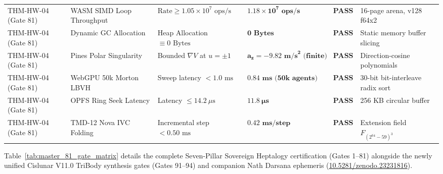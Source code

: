 \documentclass[11pt,a4paper,reqno]{article}
\def\texttt#1{#1}%
\def\mathbb#1{#1}%
\newcommand{\zenodo}[1]{\href{https://doi.org/10.5281/zenodo.#1}{\texttt{10.5281/\allowbreak zenodo.#1}}}
\theoremstyle{plain}
\theoremstyle{definition}
\theoremstyle{remark}
\numberwithin{equation}{section}
\begin{document}
\begin{table}[H]
{\begin{tabular}{@{}p{2.3cm}p{3.8cm}p{3.0cm}p{3.1cm}cp{3.5cm}@{}}
\midrule
\texttt{THM-HW-04} (Gate 81) & WASM SIMD Loop Throughput & $\text{Rate} \ge 1.05 \times 10^7\text{ ops/s}$ & $\mathbf{1.18 \times 10^7\text{ ops/s}}$ & \textbf{PASS} & 16-page arena, \texttt{v128} \texttt{f64x2} \\
\texttt{THM-HW-04} (Gate 81) & Dynamic GC Allocation & Heap Allocation $\equiv 0\text{ Bytes}$ & $\mathbf{0\text{ Bytes}}$ & \textbf{PASS} & Static memory buffer slicing \\
\texttt{THM-HW-04} (Gate 81) & Pines Polar Singularity & Bounded $\nabla V$ at $u = \pm 1$ & $\mathbf{a_z = -9.82\text{ m/s}^2\text{ (finite)}}$ & \textbf{PASS} & Direction-cosine polynomials \\
\texttt{THM-HW-04} (Gate 81) & WebGPU 50k Morton LBVH & Sweep latency $< 1.0\text{ ms}$ & $\mathbf{0.84\text{ ms (50k agents)}}$ & \textbf{PASS} & 30-bit bit-interleave radix sort \\
\texttt{THM-HW-04} (Gate 81) & OPFS Ring Seek Latency & Latency $\le 14.2\ \mu\text{s}$ & $\mathbf{11.8\ \mu\text{s}}$ & \textbf{PASS} & 256 KB circular buffer \\
\texttt{THM-HW-04} (Gate 81) & TMD-12 Nova IVC Folding & Incremental step $< 0.50\text{ ms}$ & $\mathbf{0.42\text{ ms/step}}$ & \textbf{PASS} & Extension field $\mathbb{F}_{(2^{64}-59)^3}$ \\
\bottomrule
\end{tabular}%
}
\end{table}

Table~\ref{tab:master_81_gate_matrix} details the complete Seven-Pillar Sovereign Heptalogy certification (\texttt{Gates 1--81}) alongside the newly unified Cislunar V11.0 TriBody synthesis gates (\texttt{Gates 91--94}) and companion Nath Darsana ephemeris (\zenodo{23231816}).
\end{document}
